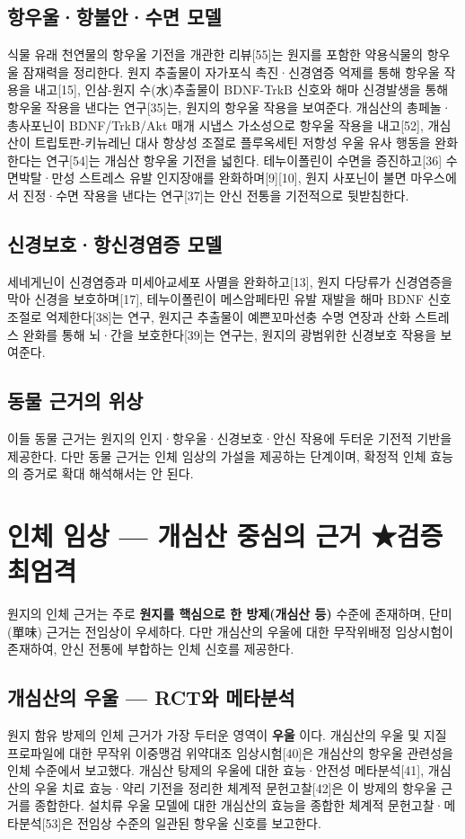\documentclass[11pt,oneside]{book}
\begin{document}
\subsection{항우울·항불안·수면 모델}
식물 유래 천연물의 항우울 기전을 개관한 리뷰[55]는 원지를 포함한 약용식물의 항우울 잠재력을 정리한다. 원지 추출물이 자가포식 촉진·신경염증 억제를 통해 항우울 작용을 내고[15], 인삼-원지 수(水)추출물이 BDNF-TrkB 신호와 해마 신경발생을 통해 항우울 작용을 낸다는 연구[35]는, 원지의 항우울 작용을 보여준다. 개심산의 총페놀·총사포닌이 BDNF/TrkB/Akt 매개 시냅스 가소성으로 항우울 작용을 내고[52], 개심산이 트립토판-키뉴레닌 대사 항상성 조절로 플루옥세틴 저항성 우울 유사 행동을 완화한다는 연구[54]는 개심산 항우울 기전을 넓힌다. 테누이폴린이 수면을 증진하고[36] 수면박탈·만성 스트레스 유발 인지장애를 완화하며[9][10], 원지 사포닌이 불면 마우스에서 진정·수면 작용을 낸다는 연구[37]는 안신 전통을 기전적으로 뒷받침한다.

\subsection{신경보호·항신경염증 모델}
세네게닌이 신경염증과 미세아교세포 사멸을 완화하고[13], 원지 다당류가 신경염증을 막아 신경을 보호하며[17], 테누이폴린이 메스암페타민 유발 재발을 해마 BDNF 신호 조절로 억제한다[38]는 연구, 원지근 추출물이 예쁜꼬마선충 수명 연장과 산화 스트레스 완화를 통해 뇌·간을 보호한다[39]는 연구는, 원지의 광범위한 신경보호 작용을 보여준다.

\subsection{동물 근거의 위상}
이들 동물 근거는 원지의 인지·항우울·신경보호·안신 작용에 두터운 기전적 기반을 제공한다. 다만 동물 근거는 인체 임상의 가설을 제공하는 단계이며, 확정적 인체 효능의 증거로 확대 해석해서는 안 된다.

\section{인체 임상 — 개심산 중심의 근거 ★검증 최엄격}
원지의 인체 근거는 주로 \textbf{원지를 핵심으로 한 방제(개심산 등)} 수준에 존재하며, 단미(單味) 근거는 전임상이 우세하다. 다만 개심산의 우울에 대한 무작위배정 임상시험이 존재하여, 안신 전통에 부합하는 인체 신호를 제공한다.

\subsection{개심산의 우울 — RCT와 메타분석}
원지 함유 방제의 인체 근거가 가장 두터운 영역이 \textbf{우울} 이다. 개심산의 우울 및 지질 프로파일에 대한 무작위 이중맹검 위약대조 임상시험[40]은 개심산의 항우울 관련성을 인체 수준에서 보고했다. 개심산 탕제의 우울에 대한 효능·안전성 메타분석[41], 개심산의 우울 치료 효능·약리 기전을 정리한 체계적 문헌고찰[42]은 이 방제의 항우울 근거를 종합한다. 설치류 우울 모델에 대한 개심산의 효능을 종합한 체계적 문헌고찰·메타분석[53]은 전임상 수준의 일관된 항우울 신호를 보고한다.
\end{document}
